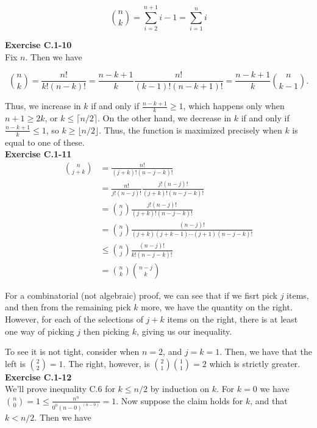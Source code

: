 \documentclass{article}
\begin{document}
\[
\binom{n}{k} = \sum_{i=2}^{n+1} i-1 = \sum_{i=1}^{n} i
\]

\noindent\textbf{Exercise C.1-10}\\

Fix $n$.  Then we have 

\[{n \choose k} = \frac{n!}{k!(n-k)!} = \frac{n-k+1}{k} \frac{n!}{(k-1)!(n-k+1)!} = \frac{n-k+1}{k}{n \choose k-1}.\]

Thus, we increase in $k$ if and only if $\frac{n-k+1}{k} \geq 1$, which happens only when $n+1 \geq 2k$, or $k \leq \lceil n/2 \rceil$.  On the other hand, we decrease in $k$ if and only if $\frac{n-k+1}{k} \leq 1$, so $k \geq \lfloor n/2 \rfloor$.  Thus, the function is maximized precisely when $k$ is equal to one of these. \\

\noindent\textbf{Exercise C.1-11}\\

\begin{align*}
\binom{n}{j+k} &= \frac{n!}{(j+k)!(n-j-k)!}\\
&=\frac{n!}{j! (n-j)!} \frac{j! (n-j)!}{(j+k)! (n-j-k)!}\\
&=\binom{n}{j}\frac{j! (n-j)!}{(j+k)! (n-j-k)!}\\
&= \binom{n}{j} \frac{(n-j)!}{(j+k)(j+k-1)\cdots (j+1) (n-j-k)!}\\
&\le\binom{n}{j} \frac{(n-j)!}{k! (n-j-k)!}\\
&=\binom{n}{k}\binom{n-j}{k}
\end{align*}

For a combinatorial (not algebraic) proof, we can see that if we fisrt pick $j$ items, and then from the remaining pick $k$ more, we have the quantity on the right. However, for each of the selections of $j+k$ items on the right, there is at least one way of picking $j$ then picking $k$, giving us our inequality.

To see it is not tight, consider when $n=2$, and $j=k=1$. Then, we have that the left is $\binom{2}{2} = 1$. The right, however, is $\binom{2}{1}\binom{1}{1} = 2$ which is strictly greater.\\

\noindent\textbf{Exercise C.1-12}\\

We'll prove inequality C.6 for $k \leq n/2$ by induction on $k$. For $k=0$ we have ${n \choose 0} = 1 \leq \frac{n^n}{0^0 (n-0)^{(n-0)}} = 1$. Now suppose the claim holds for $k$, and that $k < n/2$.  Then we have 
\end{document}
